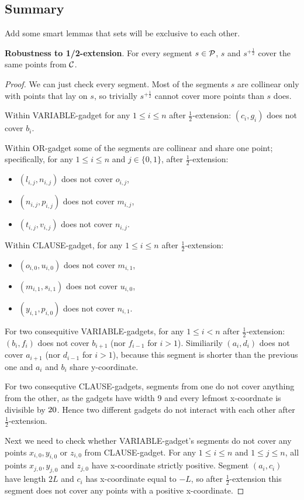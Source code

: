 \subsection{Summary}

Add some smart lemmas that sets will be exclusive to each other.

\begin{lemma}
\textbf{Robustness to 1/2-extension}. For every segment $s \in \mathcal{P}$,
$s$ and $s^{+\frac{1}{2}}$ cover the same points from $\mathcal{C}$.
\end{lemma}

\begin{proof}
We can just check every segment. Most of the segments $s$
are collinear only with points that lay on $s$,
so trivially $s^{+\frac{1}{2}}$ cannot cover more points than $s$ does.

Within VARIABLE-gadget for any $1 \le i \le n$ after $\frac{1}{2}$-extension:
$(c_i,g_i)$ does not cover $b_i$.

Within OR-gadget some of the segments are collinear and share one point;
specifically, for any $1 \le i \le n$ and $j \in \{0,1\}$, after $\frac{1}{2}$-extension:
\begin{itemize}
\item $(l_{i,j}, n_{i,j})$ does not cover $o_{i,j}$,
\item $(n_{i,j}, p_{i,j})$ does not cover $m_{i,j}$,
\item $(t_{i,j}, v_{i,j})$ does not cover $n_{i,j}$.
\end{itemize}
Within CLAUSE-gadget, for any $1 \le i \le n$ after $\frac{1}{2}$-extension:
\begin{itemize}
\item $(o_{i,0}, u_{i,0})$ does not cover $m_{i,1}$,
\item $(m_{i,1}, s_{i,1})$ does not cover $u_{i,0}$,
\item $(y_{i,1}, p_{i,0})$ does not cover $n_{i,1}$.
\end{itemize}
For two consequitive VARIABLE-gadgets, for any $1 \le i < n$ after $\frac{1}{2}$-extension:
$(b_i, f_i)$ does not cover $b_{i+1}$ (nor $f_{i-1}$ for $i>1$).
Similiarily $(a_i,d_i)$ does not cover $a_{i+1}$ (nor $d_{i-1}$ for $i>1$),
because this segment is shorter than the previous one and $a_i$ and $b_i$
share y-coordinate.

For two consequtive CLAUSE-gadgets,
segments from one do not cover anything from the other,
as the gadgets have width 9 and
every lefmost x-coordnate is divisible by $20$.
Hence two different gadgets do not interact with each other
after $\frac{1}{2}$-extension.

Next we need to check whether VARIABLE-gadget's segments
do not cover any points $x_{i,0}, y_{i,0}$ or $z_{i,0}$ from CLAUSE-gadget.
For any $1 \le i \le n$ and $1 \le j \le n$, all points $x_{j,0}, y_{j,0}$ and $z_{j,0}$
have x-coordinate strictly positive. Segment $(a_i, c_i)$ have length $2L$
and $c_i$ has x-coordinate equal to $-L$, so after $\frac{1}{2}$-extension
this segment does not cover any points with a positive x-coordinate.


\end{proof}


